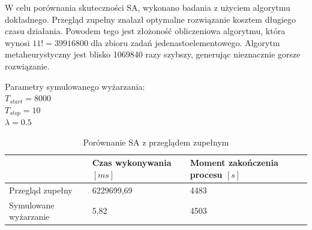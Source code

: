 W celu porównania skuteczności SA, wykonano badania z użyciem algorytmu dokładnego. Przegląd zupełny znalazł optymalne rozwiązanie kosztem długiego czasu działania. Powodem tego jest złożoność obliczeniowa algorytmu, która wynosi $11! = 39916800$ dla zbioru zadań jedenastoelementowego. Algorytm metaheurystyczny jest blisko 1069840 razy szybszy, generując nieznacznie gorsze rozwiązanie.

\breakparagraph{}
Parametry symulowanego wyżarzania:
\\$T_{start}=8000$\\$T_{stop}=10$\\$\lambda=0.5$

\begin{table}[H]
	\centering
	\caption{Porównanie SA z przeglądem zupełnym}
	\label{comapte_sa_bf}
	\begin{tabular}{lll}
		\toprule
		                       & Czas wykonywania $[ms]$ & Moment zakończenia procesu $[s]$ \\
		\midrule
		Przegląd zupełny     & 6229699,69             & 4483                             \\
		Symulowane wyżarzanie & 5,82                   & 4503                             \\
		\bottomrule
	\end{tabular}
\end{table}